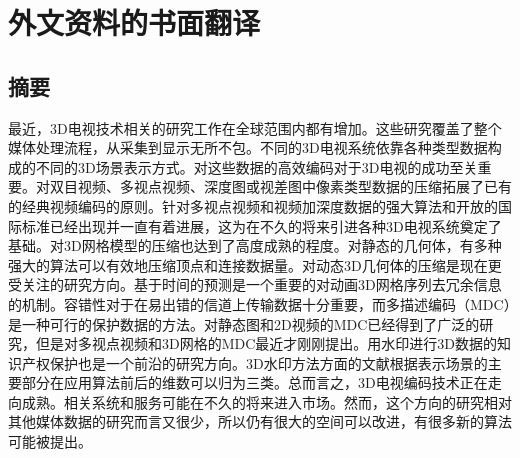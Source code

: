 %
%
%

\chapter{外文资料的书面翻译}

\begin{center}
\end{center}

\section{摘要}

最近，3D电视技术相关的研究工作在全球范围内都有增加。这些研究覆盖了整个媒体处理流程，从采集到显示无所不包。不同的3D电视系统依靠各种类型数据构成的不同的3D场景表示方式。对这些数据的高效编码对于3D电视的成功至关重要。对双目视频、多视点视频、深度图或视差图中像素类型数据的压缩拓展了已有的经典视频编码的原则。针对多视点视频和视频加深度数据的强大算法和开放的国际标准已经出现并一直有着进展，这为在不久的将来引进各种3D电视系统奠定了基础。对3D网格模型的压缩也达到了高度成熟的程度。对静态的几何体，有多种强大的算法可以有效地压缩顶点和连接数据量。对动态3D几何体的压缩是现在更受关注的研究方向。基于时间的预测是一个重要的对动画3D网格序列去冗余信息的机制。容错性对于在易出错的信道上传输数据十分重要，而多描述编码（MDC）是一种可行的保护数据的方法。对静态图和2D视频的MDC已经得到了广泛的研究，但是对多视点视频和3D网格的MDC最近才刚刚提出。用水印进行3D数据的知识产权保护也是一个前沿的研究方向。3D水印方法方面的文献根据表示场景的主要部分在应用算法前后的维数可以归为三类。总而言之，3D电视编码技术正在走向成熟。相关系统和服务可能在不久的将来进入市场。然而，这个方向的研究相对其他媒体数据的研究而言又很少，所以仍有很大的空间可以改进，有很多新的算法可能被提出。

